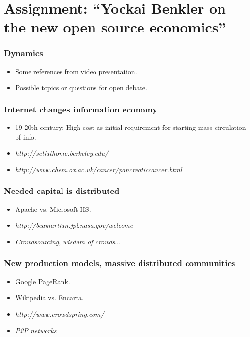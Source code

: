 \section{Assignment: ``Yockai Benkler on the new open source economics''}

\begin{frame}
\frametitle{Dynamics}
\begin{itemize}
\item Some references from video presentation.
\item Possible topics or questions for open debate.
\end{itemize}
\end{frame}


\begin{frame}
 \frametitle{Internet changes information economy}
 \begin{itemize}
  \item 19-20th century: High cost as initial requirement for starting mass circulation of info.
  \item \textit{http://setiathome.berkeley.edu/}
  \item \textit{http://www.chem.ox.ac.uk/cancer/pancreaticcancer.html}
 \end{itemize}


\end{frame}


\begin{frame}
 \frametitle{Needed capital is distributed}
 \begin{itemize}
  \item Apache vs. Microsoft IIS.
  \item \textit{http://beamartian.jpl.nasa.gov/welcome}
  \item \textit{Crowdsourcing}, \textit{wisdom of crowds}...
 \end{itemize}

\end{frame}


\begin{frame}
 \frametitle{New production models, massive distributed communities}
 \begin{itemize}
  \item Google PageRank.
  \item Wikipedia vs. Encarta.
  \item \textit{http://www.crowdspring.com/}
  \item \textit{P2P networks}
 \end{itemize}

\end{frame}
